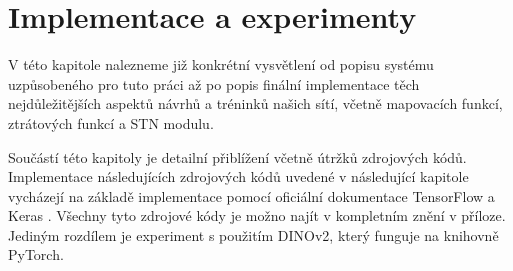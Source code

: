 \chapter{Implementace a experimenty}
\label{sec:Chapter5}
V této kapitole nalezneme již konkrétní vysvětlení od popisu systému uzpůsobeného pro tuto práci až po popis finální implementace těch nejdůležitějších aspektů návrhů a tréninků našich sítí, včetně mapovacích funkcí, ztrátových funkcí a STN modulu. 

Součástí této kapitoly je detailní přiblížení včetně útržků zdrojových kódů. Implementace následujících zdrojových kódů uvedené v následující kapitole vycházejí na základě implementace pomocí oficiální dokumentace TensorFlow a Keras \cite{tensorflow_doc}. Všechny tyto zdrojové kódy je možno najít v kompletním znění v příloze. Jediným rozdílem je experiment s použitím DINOv2, který funguje na knihovně PyTorch.

\endinput